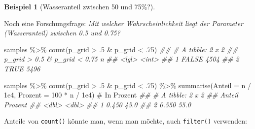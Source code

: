 \documentclass[
  a4paper,
  DIV=11]{scrreprt}
\newenvironment{Shaded}{\begin{snugshade}}{\end{snugshade}}
\newcommand{\AttributeTok}[1]{\textcolor[rgb]{0.40,0.45,0.13}{#1}}
\newcommand{\CommentTok}[1]{\textcolor[rgb]{0.37,0.37,0.37}{#1}}
\newcommand{\DecValTok}[1]{\textcolor[rgb]{0.68,0.00,0.00}{#1}}
\newcommand{\DocumentationTok}[1]{\textcolor[rgb]{0.37,0.37,0.37}{\textit{#1}}}
\newcommand{\FloatTok}[1]{\textcolor[rgb]{0.68,0.00,0.00}{#1}}
\newcommand{\FunctionTok}[1]{\textcolor[rgb]{0.28,0.35,0.67}{#1}}
\newcommand{\NormalTok}[1]{\textcolor[rgb]{0.00,0.23,0.31}{#1}}
\newcommand{\SpecialCharTok}[1]{\textcolor[rgb]{0.37,0.37,0.37}{#1}}
\theoremstyle{definition}
\newtheorem{example}{Beispiel}[chapter]
\theoremstyle{remark}
\begin{document}
\leavevmode{}%
\begin{example}[Wasseranteil zwischen 50 und 75\%?]\label{exm-param2}

Noch eine Forschungsfrage: \emph{Mit welcher Wahrscheinlichkeit liegt
der Parameter (Wasseranteil) zwischen 0.5 und 0.75?}

\begin{Shaded}
\begin{Highlighting}[]
\NormalTok{samples }\SpecialCharTok{\%\textgreater{}\%} 
  \FunctionTok{count}\NormalTok{(p\_grid }\SpecialCharTok{\textgreater{}}\NormalTok{ .}\DecValTok{5} \SpecialCharTok{\&}\NormalTok{ p\_grid }\SpecialCharTok{\textless{}}\NormalTok{ .}\DecValTok{75}\NormalTok{)}
\DocumentationTok{\#\# \# A tibble: 2 x 2}
\DocumentationTok{\#\#   \textasciigrave{}p\_grid \textgreater{} 0.5 \& p\_grid \textless{} 0.75\textasciigrave{}     n}
\DocumentationTok{\#\#   \textless{}lgl\textgreater{}                          \textless{}int\textgreater{}}
\DocumentationTok{\#\# 1 FALSE                           4504}
\DocumentationTok{\#\# 2 TRUE                            5496}
\end{Highlighting}
\end{Shaded}

\begin{Shaded}
\begin{Highlighting}[]
\NormalTok{samples }\SpecialCharTok{\%\textgreater{}\%} 
  \FunctionTok{count}\NormalTok{(p\_grid }\SpecialCharTok{\textgreater{}}\NormalTok{ .}\DecValTok{5} \SpecialCharTok{\&}\NormalTok{ p\_grid }\SpecialCharTok{\textless{}}\NormalTok{ .}\DecValTok{75}\NormalTok{) }\SpecialCharTok{\%\textgreater{}\%} 
  \FunctionTok{summarise}\NormalTok{(}\AttributeTok{Anteil =}\NormalTok{ n }\SpecialCharTok{/} \FloatTok{1e4}\NormalTok{,}
            \AttributeTok{Prozent =} \DecValTok{100} \SpecialCharTok{*}\NormalTok{ n }\SpecialCharTok{/} \FloatTok{1e4}\NormalTok{)  }\CommentTok{\# In Prozent}
\DocumentationTok{\#\# \# A tibble: 2 x 2}
\DocumentationTok{\#\#   Anteil Prozent}
\DocumentationTok{\#\#    \textless{}dbl\textgreater{}   \textless{}dbl\textgreater{}}
\DocumentationTok{\#\# 1  0.450    45.0}
\DocumentationTok{\#\# 2  0.550    55.0}
\end{Highlighting}
\end{Shaded}

Anteile von \texttt{count()} könnte man, wenn man möchte, auch
\texttt{filter()} verwenden:


\end{example}
\end{document}

